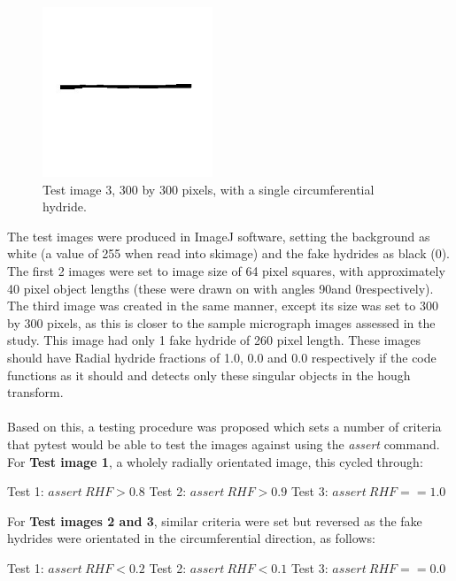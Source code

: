 \documentclass{article}
\begin{document}
    \begin{figure}[H]
        \begin{center}
        \includegraphics[width=2.0in]{Figures/Test_3.jpg} 
        \caption{Test image 3, 300 by 300 pixels, with a single circumferential hydride.}
        \label{TestImage300}
        \end{center}
    \end{figure}

    The test images were produced in ImageJ software, setting the background as white (a value of 255 when read into skimage) and the fake hydrides as black (0). The first 2 images were set to image size of 64 pixel squares, with approximately 40 pixel object lengths (these were drawn on with angles 90\textdegree and 0\textdegree respectively). The third image was created in the same manner, except its size was set to 300 by 300 pixels, as this is closer to the sample micrograph images assessed in the study. This image had only 1 fake hydride of 260 pixel length. These images should have Radial hydride fractions of 1.0, 0.0 and 0.0 respectively if the code functions as it should and detects only these singular objects in the hough transform.
    \\
    \\
    Based on this, a testing procedure was proposed which sets a number of criteria that pytest would be able to test the images against using the \textit{assert} command. For \textbf{Test image 1}, a wholely radially orientated image, this cycled through:

    \begin{center}
        Test 1: $assert\:RHF > 0.8$ \newline
        Test 2: $assert\:RHF > 0.9$ \newline
        Test 3: $assert\:RHF == 1.0$ \newline
    \end{center}

    For \textbf{Test images 2 and 3}, similar criteria were set but reversed as the fake hydrides were orientated in the circumferential direction, as follows:
    \begin{center}
        Test 1: $assert\:RHF < 0.2$ \newline
        Test 2: $assert\:RHF < 0.1$ \newline
        Test 3: $assert\:RHF == 0.0$ \newline 
    \end{center}
\end{document}
